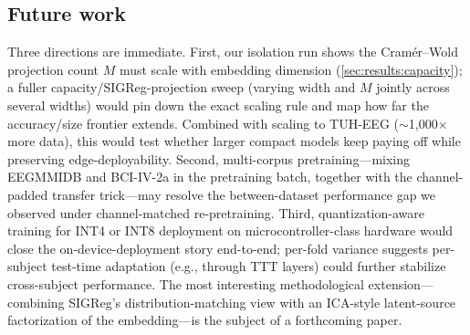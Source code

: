 \subsection{Future work}

Three directions are immediate. First, our isolation run shows the
Cram\'er--Wold projection count $M$ must scale with embedding dimension
(\cref{sec:results:capacity}); a fuller capacity/SIGReg-projection sweep
(varying width and $M$ jointly across several widths) would pin down the
exact scaling rule and map how far the accuracy/size frontier extends.
Combined with scaling to TUH-EEG ($\sim$1{,}000$\times$ more data), this
would test whether larger compact models keep paying off while preserving
edge-deployability. Second, multi-corpus
pretraining---mixing EEGMMIDB and BCI-IV-2a in the pretraining batch,
together with the channel-padded transfer trick---may resolve the
between-dataset performance gap we observed under channel-matched
re-pretraining. Third, quantization-aware training for INT4 or INT8
deployment on microcontroller-class hardware would close the
on-device-deployment story end-to-end; per-fold variance suggests
per-subject test-time adaptation (e.g., through TTT layers) could
further stabilize cross-subject performance. The most interesting
methodological extension---combining SIGReg's distribution-matching
view with an ICA-style latent-source factorization of the
embedding---is the subject of a forthcoming paper.
